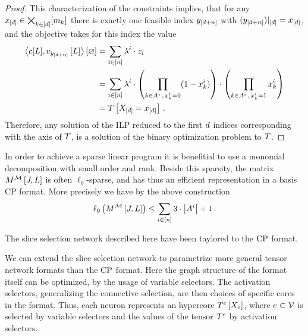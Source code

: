 \begin{proof}
    This characterization of the constraints implies, that for any $x_{[d]}\in\bigtimes_{k\in[d]}[m_{k}]$ there is exactly one feasible index $y_{[d+n]}$ with ${(y_{[d+n]})}|_{[d]}=x_{[d]}$, and the objective takes for this index the value
    \begin{align*}
        \left\langle c[L], v_{y_{[d+n]}}\left[L\right]\right\rangle \left[ \varnothing \right]
        &= \sum_{i\in[n]} \lambda^{i} \cdot z_{i} \\
        &= \sum_{i\in[n]} \lambda^{i} \cdot \left( \prod_{k\in A^{i} \, , \,  x_{k}^i = 0} (1 - x_{k}^i) \right)
        \cdot \left( \prod_{k\in A^{i} \, , \,  x_{k}^i = 1}  x_{k}^i \right)  \\
        & = T\left[X_{[d]}=x_{[d]}\right] \, .
    \end{align*}
    Therefore, any solution of the ILP reduced to the first $d$ indices corresponding with the axis of $T$, is a solution of the binary optimization problem to $T$.
\end{proof}


In order to achieve a sparse linear program it is benefitial to use a monomial decomposition with small order and rank.
Beside this sparsity, the matrix $M^{\mathcal{M}}\left[J,L\right]$ is often $\ell_0$-sparse, and has thus an efficient representation in a basis CP format.
More precisely we have by the above construction
\begin{align*}
    \ell_0\left(M^{\mathcal{M}}\left[J,L\right]\right) \leq \sum_{i\in[n]} 3 \cdot \left|A^{i}\right| +1 \, .
\end{align*}


The slice selection network described here have been taylored to the $\mathrm{CP}$ format.

We can extend the slice selection network to parametrize more general tensor network formats than the $\mathrm{CP}$ format.
Here the graph structure of the format itself can be optimized, by the usage of variable selectors.
The activation selectors, generalizing the connective selection, are then choices of specific cores in the format.
Thus, each neuron represents an hypercore $T^{e}\left[X_{e}\right]$, where $e\subset\mathcal{V}$ is selected by variable selectors and the values of the tensor $T^{e}$ by activation selectors.